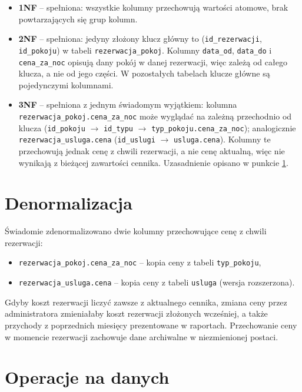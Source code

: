 \documentclass[12pt,a4paper]{article}
\newcommand{\us}{\_\allowbreak}
\begin{document}
\begin{itemize}
    \item \textbf{1NF} -- spełniona: wszystkie kolumny przechowują wartości
          atomowe, brak powtarzających się grup kolumn.
    \item \textbf{2NF} -- spełniona: jedyny złożony klucz główny to
          (\texttt{id\us rezerwacji}, \texttt{id\us pokoju}) w tabeli
          \texttt{rezerwacja\us pokoj}. Kolumny \texttt{data\us od},
          \texttt{data\us do} i \texttt{cena\us za\us noc} opisują dany pokój
          w danej rezerwacji, więc zależą od całego klucza, a nie od jego części. W pozostałych tabelach klucze główne są pojedynczymi kolumnami.
    \item \textbf{3NF} -- spełniona z jednym świadomym wyjątkiem: kolumna
          \texttt{rezerwacja\us pokoj.cena\us za\us noc} może wyglądać na zależną
          przechodnio od klucza
          (\texttt{id\us pokoju} $\rightarrow$ \texttt{id\us typu} $\rightarrow$
          \texttt{typ\us pokoju.cena\us za\us noc}); analogicznie
          \texttt{rezerwacja\us usluga.cena}
          (\texttt{id\us uslugi} $\rightarrow$ \texttt{usluga.cena}).
          Kolumny te przechowują jednak cenę z chwili rezerwacji, a nie cenę
          aktualną, więc nie wynikają z bieżącej zawartości cennika.
          Uzasadnienie opisano w punkcie \ref{sec:denormalizacja}.
\end{itemize}


\section{Denormalizacja}
\label{sec:denormalizacja}

\noindent Świadomie zdenormalizowano dwie kolumny przechowujące cenę z chwili
rezerwacji:
\begin{itemize}
    \item \texttt{rezerwacja\us pokoj.cena\us za\us noc} -- kopia ceny z tabeli
          \texttt{typ\us pokoju},
    \item \texttt{rezerwacja\us usluga.cena} -- kopia ceny z tabeli
          \texttt{usluga} (wersja rozszerzona).
\end{itemize}

\noindent Gdyby koszt rezerwacji liczyć zawsze z aktualnego cennika, zmiana ceny przez
administratora zmieniałaby koszt rezerwacji złożonych wcześniej, a także
przychody z poprzednich miesięcy prezentowane w raportach. Przechowanie ceny
w momencie rezerwacji zachowuje dane archiwalne w niezmienionej postaci.

\section{Operacje na danych}
\end{document}
